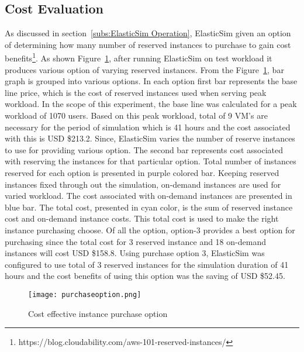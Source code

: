 \subsection{Cost Evaluation}
\label{sub:Cost Evaluation}
As discussed in section~\ref{subs:ElasticSim Operation}, ElasticSim given an option of determining how many number of reserved instances to purchase to gain cost benefits\footnote{https://blog.cloudability.com/aws-101-reserved-instances/}. As shown Figure~\ref{figure:purchaseoption}, after running ElasticSim on test workload it produces various option of varying reserved instances. From the Figure~\ref{figure:purchaseoption}, bar graph is grouped into various options. In each option first bar represents the base line price, which is the cost of reserved instances used when serving peak workload. In the scope of this experiment, the base line was calculated for a peak workload of 1070 users. Based on this peak workload, total of 9 VM's are necessary for the period of simulation which is 41 hours and the cost associated with this is USD \$213.2. Since, ElasticSim varies the number of reserve instances to use for providing various option. The second bar represents cost associated with reserving the instances for that particular option. Total number of instances reserved for each option is presented in purple colored bar. Keeping reserved instances fixed through out the simulation, on-demand instances are used for varied workload. The cost associated with on-demand instances are presented in blue bar. The total cost, presented in cyan color, is the sum of reserved instance cost and on-demand instance costs. This total cost is used to make the right instance purchasing choose. Of all the option, option-3 provides a best option for purchasing since the total cost for 3 reserved instance and 18 on-demand instances will cost USD \$158.8. Using purchase option 3, ElasticSim was configured to use total of 3 reserved instances for the simulation duration of 41 hours and the cost benefits of using this option was the saving of USD \$52.45. 
\begin{figure}[h]
  \begin{center}
    \texttt{[image: purchaseoption.png]}
    \caption{Cost effective instance purchase option}
    \label{figure:purchaseoption}
  \end{center}
\end{figure}

